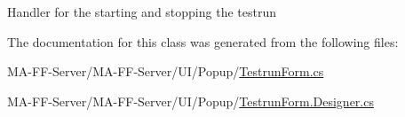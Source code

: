 Handler for the starting and stopping the testrun 



The documentation for this class was generated from the following files\+:\begin{DoxyCompactItemize}
\item 
M\+A-\/\+F\+F-\/\+Server/\+M\+A-\/\+F\+F-\/\+Server/\+U\+I/\+Popup/\hyperlink{_testrun_form_8cs}{Testrun\+Form.\+cs}\item 
M\+A-\/\+F\+F-\/\+Server/\+M\+A-\/\+F\+F-\/\+Server/\+U\+I/\+Popup/\hyperlink{_testrun_form_8_designer_8cs}{Testrun\+Form.\+Designer.\+cs}\end{DoxyCompactItemize}
